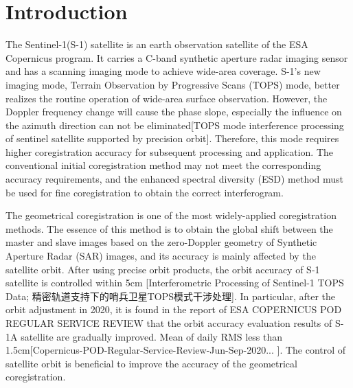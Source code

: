 \documentclass[a4paper,fleqn]{cas-dc}
\begin{document}
\maketitle

\section{Introduction}\label{Introduction}

The Sentinel-1(S-1) satellite is an earth observation satellite of the ESA Copernicus program. It carries a C-band synthetic aperture radar imaging sensor and has a scanning imaging mode to achieve wide-area coverage. S-1’s new imaging mode, Terrain Observation by Progressive Scans (TOPS) mode, better realizes the routine operation of wide-area surface observation. However, the Doppler frequency change will cause the phase slope, especially the influence on the azimuth direction can not be eliminated[TOPS mode interference processing of sentinel satellite supported by precision orbit]. Therefore, this mode requires higher coregistration accuracy for subsequent processing and application. The conventional initial coregistration method may not meet the corresponding accuracy requirements, and the enhanced spectral diversity (ESD) method must be used for fine coregistration to obtain the correct interferogram. \par
The geometrical coregistration is one of the most widely-applied coregistration methods. The essence of this method is to obtain the global shift between the master and slave images based on the zero-Doppler geometry of Synthetic Aperture Radar (SAR) images, and its accuracy is mainly affected by the satellite orbit. After using precise orbit products, the orbit accuracy of S-1 satellite is controlled within 5cm [Interferometric Processing of Sentinel-1 TOPS Data; 精密轨道支持下的哨兵卫星TOPS模式干涉处理]. In particular, after the orbit adjustment in 2020, it is found in the report of ESA COPERNICUS POD REGULAR SERVICE REVIEW that the orbit accuracy evaluation results of S-1A satellite are gradually improved. Mean of daily RMS less than 1.5cm[Copernicus-POD-Regular-Service-Review-Jun-Sep-2020... ]. The control of satellite orbit is beneficial to improve the accuracy of the geometrical coregistration. \par
\end{document}
